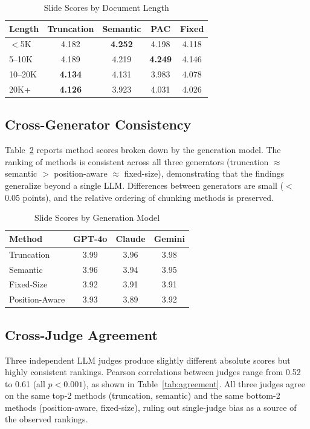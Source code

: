 \documentclass{ieeeaccess}
\begin{document}
\begin{table}[h]
\caption{Slide Scores by Document Length}
\label{tab:length}
\centering
\footnotesize
\begin{tabular}{|l|c|c|c|c|}
\hline
\textbf{Length} & \textbf{Truncation} & \textbf{Semantic} & \textbf{PAC} & \textbf{Fixed} \\
\hline
$<$5K & 4.182 & \textbf{4.252} & 4.198 & 4.118 \\
5--10K & 4.189 & 4.219 & \textbf{4.249} & 4.146 \\
10--20K & \textbf{4.134} & 4.131 & 3.983 & 4.078 \\
20K+ & \textbf{4.126} & 3.923 & 4.031 & 4.026 \\
\hline
\end{tabular}
\end{table}

\subsection{Cross-Generator Consistency}

Table~\ref{tab:bygen} reports method scores broken down by the generation model. The ranking of methods is consistent across all three generators (truncation $\approx$ semantic $>$ position-aware $\approx$ fixed-size), demonstrating that the findings generalize beyond a single LLM. Differences between generators are small ($<$0.05 points), and the relative ordering of chunking methods is preserved.

\begin{table}[h]
\caption{Slide Scores by Generation Model}
\label{tab:bygen}
\centering
\footnotesize
\begin{tabular}{|l|c|c|c|}
\hline
\textbf{Method} & \textbf{GPT-4o} & \textbf{Claude} & \textbf{Gemini} \\
\hline
Truncation & 3.99 & 3.96 & 3.98 \\
Semantic & 3.96 & 3.94 & 3.95 \\
Fixed-Size & 3.92 & 3.91 & 3.91 \\
Position-Aware & 3.93 & 3.89 & 3.92 \\
\hline
\end{tabular}
\end{table}

\subsection{Cross-Judge Agreement}

Three independent LLM judges produce slightly different absolute scores but highly consistent rankings. Pearson correlations between judges range from 0.52 to 0.61 (all $p < 0.001$), as shown in Table~\ref{tab:agreement}. All three judges agree on the same top-2 methods (truncation, semantic) and the same bottom-2 methods (position-aware, fixed-size), ruling out single-judge bias as a source of the observed rankings.
\end{document}
